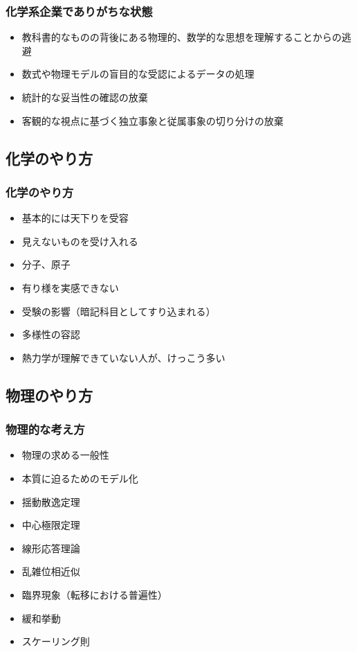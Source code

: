 \documentclass[12pt, dvipdfmx]{beamer}
\begin{document}
\begin{frame}
    \frametitle{化学系企業でありがちな状態}
    \begin{itemize}
        \item 教科書的なものの背後にある物理的、数学的な思想を理解することからの逃避
        \item 数式や物理モデルの盲目的な受認によるデータの処理
        \item 統計的な妥当性の確認の放棄
        \item 客観的な視点に基づく独立事象と従属事象の切り分けの放棄
    \end{itemize}

\end{frame}
\subsection{化学のやり方}
\begin{frame}
    \frametitle{化学のやり方}
    \begin{itemize}
        \item 基本的には天下りを受容
        \item 見えないものを受け入れる
        \item 分子、原子
        \item 有り様を実感できない
        \item 受験の影響（暗記科目としてすり込まれる）
        \item 多様性の容認
        \item 熱力学が理解できていない人が、けっこう多い
    \end{itemize}
\end{frame}
    
\subsection{物理のやり方}
\begin{frame}
    \frametitle{物理的な考え方}
    \begin{itemize}
        \item 物理の求める一般性
        \item 本質に迫るためのモデル化
    \end{itemize}
    \begin{itemize}
        \item 揺動散逸定理
        \item 中心極限定理
        \item 線形応答理論
        \item 乱雑位相近似
        \item 臨界現象（転移における普遍性）
        \item 緩和挙動
        \item スケーリング則
    \end{itemize}
\end{frame}
\end{document}
